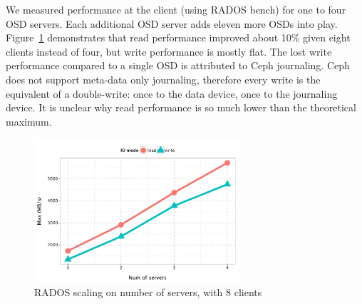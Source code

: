 We measured performance at the client (using RADOS bench) for one to four OSD
servers.  Each additional OSD server adds eleven
more OSDs into play.  Figure~\ref{fig:oss-scale} demonstrates that read
performance improved about 10\% given eight clients instead of four, but write
performance is mostly flat.  The lost write performance compared to a single
OSD is attributed to Ceph journaling.  Ceph does not support meta-data only
journaling, therefore every write is the equivalent of a double-write: once to
the data device, once to the journaling device.  It is unclear why read
performance is so much lower than the theoretical maximum.
%

\begin{figure}[htb]
\centering
\includegraphics[width=3in]{data/rados_server}
\caption{RADOS scaling on number of servers, with 8 clients}
\label{fig:oss-scale}
\end{figure}

